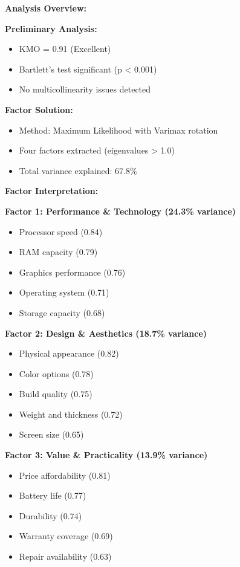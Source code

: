 \documentclass[
]{article}
\begin{document}
\textbf{Analysis Overview:}

\textbf{Preliminary Analysis:}

\begin{itemize}
\item
  KMO = 0.91 (Excellent)
\item
  Bartlett's test significant (p \textless{} 0.001)
\item
  No multicollinearity issues detected
\end{itemize}

\textbf{Factor Solution:}

\begin{itemize}
\item
  Method: Maximum Likelihood with Varimax rotation
\item
  Four factors extracted (eigenvalues \textgreater{} 1.0)
\item
  Total variance explained: 67.8\%
\end{itemize}

\textbf{Factor Interpretation:}

\textbf{Factor 1: Performance \& Technology (24.3\% variance)}

\begin{itemize}
\item
  Processor speed (0.84)
\item
  RAM capacity (0.79)
\item
  Graphics performance (0.76)
\item
  Operating system (0.71)
\item
  Storage capacity (0.68)
\end{itemize}

\textbf{Factor 2: Design \& Aesthetics (18.7\% variance)}

\begin{itemize}
\item
  Physical appearance (0.82)
\item
  Color options (0.78)
\item
  Build quality (0.75)
\item
  Weight and thickness (0.72)
\item
  Screen size (0.65)
\end{itemize}

\textbf{Factor 3: Value \& Practicality (13.9\% variance)}

\begin{itemize}
\item
  Price affordability (0.81)
\item
  Battery life (0.77)
\item
  Durability (0.74)
\item
  Warranty coverage (0.69)
\item
  Repair availability (0.63)
\end{itemize}
\end{document}
